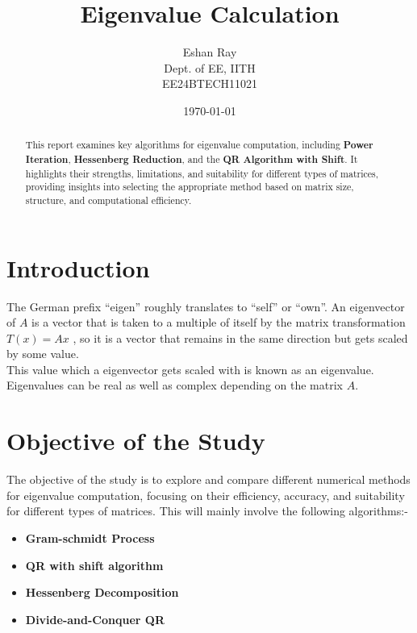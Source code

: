 \documentclass[12pt]{article}
\title{Eigenvalue Calculation}
\author{Eshan Ray \\
        Dept. of EE, IITH \\
        EE24BTECH11021}
\date{\today}  %
\begin{document}
\maketitle

\begin{abstract}
    This report examines key algorithms for eigenvalue computation, including \textbf{Power Iteration}, \textbf{Hessenberg Reduction}, and the \textbf{QR Algorithm with Shift}. It highlights their strengths, limitations, and suitability for different types of matrices, providing insights into selecting the appropriate method based on matrix size, structure, and computational efficiency.
\end{abstract}

\tableofcontents
\newpage

\section{Introduction}
The German prefix “eigen” roughly translates to “self” or “own”. An eigenvector of
$A$ is a vector that is taken to a multiple of itself by the matrix transformation $T(x) = Ax$ ,
so it is a vector that remains in the same direction but gets scaled by some value. \\
This value which a eigenvector gets scaled with is known as an eigenvalue.\\
Eigenvalues can be real as well as complex depending on the matrix $A$.

\section{Objective of the Study}
The objective of the study is to explore and compare different numerical methods for eigenvalue computation, focusing on their efficiency, accuracy, and suitability for different types of matrices. This will mainly involve the following algorithms:-
\begin{itemize}
    \item \textbf{Gram-schmidt Process}
    \item \textbf{QR with shift algorithm}
    \item \textbf{Hessenberg Decomposition}
    \item \textbf{Divide-and-Conquer QR}
\end{itemize}
    
\end{document}
